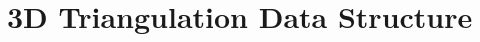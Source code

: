 \chapter{3D Triangulation Data Structure}
\label{chapter-TDS3}

\vspace*{-15mm}
\minitoc
\vspace*{30mm}



